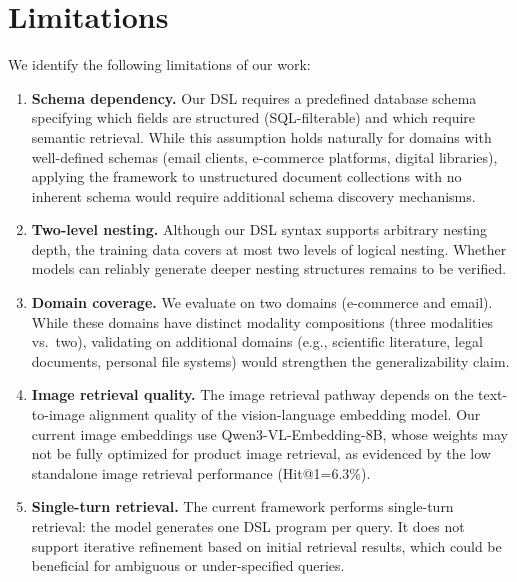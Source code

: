 \section{Limitations}
\label{sec:limitations}

We identify the following limitations of our work:

\begin{enumerate}[leftmargin=*,nosep]
\item \textbf{Schema dependency.} Our DSL requires a predefined database schema specifying which fields are structured (SQL-filterable) and which require semantic retrieval. While this assumption holds naturally for domains with well-defined schemas (email clients, e-commerce platforms, digital libraries), applying the framework to unstructured document collections with no inherent schema would require additional schema discovery mechanisms.

\item \textbf{Two-level nesting.} Although our DSL syntax supports arbitrary nesting depth, the training data covers at most two levels of logical nesting. Whether models can reliably generate deeper nesting structures remains to be verified.

\item \textbf{Domain coverage.} We evaluate on two domains (e-commerce and email). While these domains have distinct modality compositions (three modalities vs.\ two), validating on additional domains (e.g., scientific literature, legal documents, personal file systems) would strengthen the generalizability claim.

\item \textbf{Image retrieval quality.} The image retrieval pathway depends on the text-to-image alignment quality of the vision-language embedding model. Our current image embeddings use Qwen3-VL-Embedding-8B, whose weights may not be fully optimized for product image retrieval, as evidenced by the low standalone image retrieval performance (Hit@1=6.3\%).

\item \textbf{Single-turn retrieval.} The current framework performs single-turn retrieval: the model generates one DSL program per query. It does not support iterative refinement based on initial retrieval results, which could be beneficial for ambiguous or under-specified queries.
\end{enumerate}


